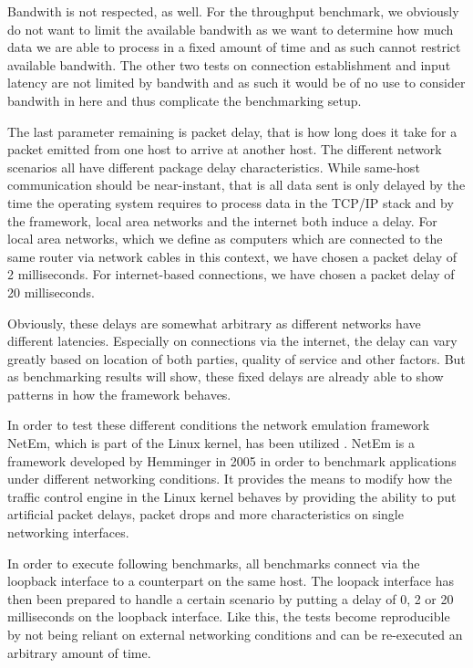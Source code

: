 Bandwith is not respected, as well.
For the throughput benchmark, we obviously do not want to limit the available bandwith as we want to determine how much data we are able to process in a fixed amount of time and as such cannot restrict available bandwith.
The other two tests on connection establishment and input latency are not limited by bandwith and as such it would be of no use to consider bandwith in here and thus complicate the benchmarking setup.

The last parameter remaining is packet delay, that is how long does it take for a packet emitted from one host to arrive at another host.
The different network scenarios all have different package delay characteristics.
While same-host communication should be near-instant, that is all data sent is only delayed by the time the operating system requires to process data in the TCP/IP stack and by the framework, local area networks and the internet both induce a delay.
For local area networks, which we define as computers which are connected to the same router via network cables in this context, we have chosen a packet delay of 2 milliseconds.
For internet-based connections, we have chosen a packet delay of 20 milliseconds.

Obviously, these delays are somewhat arbitrary as different networks have different latencies.
Especially on connections via the internet, the delay can vary greatly based on location of both parties, quality of service and other factors.
But as benchmarking results will show, these fixed delays are already able to show patterns in how the framework behaves.

In order to test these different conditions the network emulation framework NetEm, which is part of the Linux kernel, has been utilized \cite{hemminger2005network}.
NetEm is a framework developed by Hemminger in 2005 in order to benchmark applications under different networking conditions.
It provides the means to modify how the traffic control engine in the Linux kernel behaves by providing the ability to put artificial packet delays, packet drops and more characteristics on single networking interfaces.

In order to execute following benchmarks, all benchmarks connect via the loopback interface to a counterpart on the same host.
The loopack interface has then been prepared to handle a certain scenario by putting a delay of 0, 2 or 20 milliseconds on the loopback interface.
Like this, the tests become reproducible by not being reliant on external networking conditions and can be re-executed an arbitrary amount of time.

